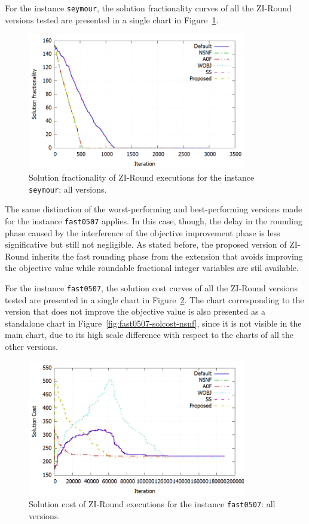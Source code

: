 \documentclass[a4paper,12pt]{book}
\begin{document}
For the instance \texttt{seymour}, the solution fractionality curves of all the ZI-Round versions tested are presented in a single chart in Figure~\ref{fig:seymour-solfrac-all}.
\begin{figure}[ht]
	\centering
	\includegraphics[width=0.85\textwidth]{seymour-solfrac-all.png}
	\caption{Solution fractionality of ZI-Round executions for the instance \texttt{seymour}: all versions.}
	\label{fig:seymour-solfrac-all}
\end{figure}
The same distinction of the worst-performing and best-performing versions made for the instance \texttt{fast0507} applies. In this case, though, the delay in the rounding phase caused by the interference of the objective improvement phase is less significative but still not negligible. As stated before, the proposed version of ZI-Round inherits the fast rounding phase from the extension that avoids improving the objective value while roundable fractional integer variables are stil available. \par

For the instance \texttt{fast0507}, the solution cost curves of all the ZI-Round versions tested are presented in a single chart in Figure~\ref{fig:fast0507-solcost-all}. The chart corresponding to the version that does not improve the objective value is also presented as a standalone chart in Figure~\ref{fig:fast0507-solcost-nsnf}, since it is not visible in the main chart, due to its high scale difference with respect to the charts of all the other versions.
\begin{figure}[ht]
	\centering
	\includegraphics[width=0.85\textwidth]{fast0507-solcost-all.png}
	\caption{Solution cost of ZI-Round executions for the instance \texttt{fast0507}: all versions.}
	\label{fig:fast0507-solcost-all}
\end{figure}
\end{document}
